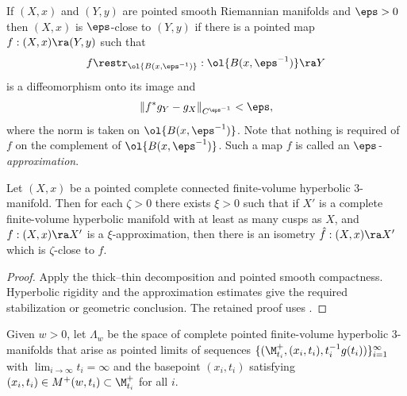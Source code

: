 \begin{definition}
  \label{def:kl-hyperbolic-rigidity-stabilization-thick-part-pointed-smooth-closeness}

If $(X,x)$ and $(Y,y)$ are pointed smooth Riemannian manifolds
and $\eps>0$ then $(X,x)$ is $\eps$-close to $(Y,y)$
if there is a pointed map $f:(X,x)\ra (Y,y)$ such that
\begin{equation}
f\restr_{\ol{B(x,\eps^{-1})}}:\ol{B(x,\eps^{-1})}\ra Y
\end{equation}
 is a diffeomorphism onto its image
and
\begin{equation}
\label{fapprox}
\|f^*g_Y-g_X\|_{C^{\eps^{-1}}}<\eps,
\end{equation}
where the norm is taken on $\ol{B(x,\eps^{-1})}$.
Note that nothing is required of $f$ on the complement of $\ol{B(x,\eps^{-1})}$.
Such a map $f$ is called an {\em $\eps$-approximation}.
\end{definition}

\begin{lemma}
  \label{lem:kl-hyperbolic-rigidity-stabilization-thick-part-existence-thick-thin-geometry}

\label{prasad}
Let $(X,x)$ be a pointed complete connected finite-volume hyperbolic
$3$-manifold.  Then for each $\zeta>0$ there exists $\xi>0$
such that if $X'$ is a complete finite-volume hyperbolic
manifold with at least as many cusps as $X$,
and $f:(X,x)\ra X'$ is a $\xi$-approximation, then there is an
isometry $\hat f: (X,x)\ra X'$ which
is $\zeta$-close to $f$.
\end{lemma}

\begin{proof}
\sketch Apply the thick--thin decomposition and pointed smooth compactness. Hyperbolic rigidity and the approximation estimates give the required stabilization or geometric conclusion.
The retained proof uses \cite{Mostow,Prasad}.
\end{proof}

\begin{definition}
  \label{def:kl-hyperbolic-rigidity-stabilization-thick-part-hyperbolic-pointed-limit-space}

Given $w >0$, let $\Lambda_w$ be the space
of complete pointed finite-volume hyperbolic
$3$-manifolds that arise as pointed limits of
sequences $\{(\M^+_{t_i}, (x_i, t_i), t_i^{-1} g(t_i))\}_{i=1}^\infty$
with $\lim_{i \rightarrow \infty} t_i = \infty$ and the basepoint
$(x_i,t_i)$ satisfying
$(x_i,t_i) \in M^+(w, t_i) \subset \M^+_{t_i}$
for all $i$.
\end{definition}

